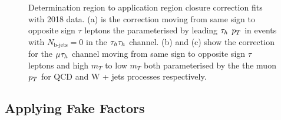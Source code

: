 \begin{figure}[!hbtp]
\centering
\caption{Determination region to application region closure correction fits with 2018 data. (a) is the correction moving from same sign to opposite sign $\tau$ leptons the parameterised by leading $\tau_{h}$ $p_{T}$ in events with $N_{\text{b-jets}}=0$ in the $\tau_{h}\tau_{h}$ channel. (b) and (c) show the correction for the $\mu_{}\tau_{h}$ channel moving from same sign to opposite sign $\tau$ leptons and high $m_{T}$ to low $m_{T}$ both parameterised by the the muon $p_{T}$ for QCD and W + jets processes respectively.}
\label{fig:ff_dr_to_ar}
\end{figure}

\subsection{Applying Fake Factors}
\label{sec:ff_applying}

